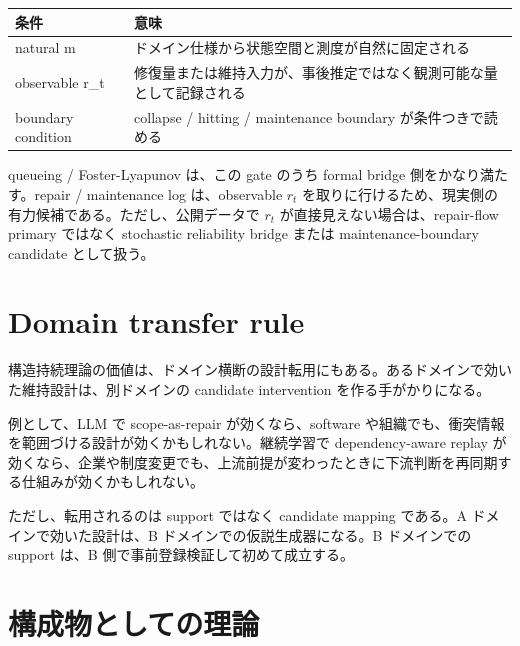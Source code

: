 \documentclass[12pt,a4paper]{article}
\begin{document}
{\def\LTcaptype{table} %
\begin{longtable}[]{@{}
  >{\raggedright\arraybackslash}p{}
  >{\raggedright\arraybackslash}p{}@{}}
\toprule\noalign{}
\begin{minipage}[b]{\linewidth}\raggedright
条件
\end{minipage} & \begin{minipage}[b]{\linewidth}\raggedright
意味
\end{minipage} \\
\midrule\noalign{}
\endhead
\bottomrule\noalign{}
\endlastfoot
natural m & ドメイン仕様から状態空間と測度が自然に固定される \\
observable r\_t & 修復量または維持入力が、事後推定ではなく観測可能な量として記録される \\
boundary condition & collapse / hitting / maintenance boundary が条件つきで読める \\
\end{longtable}
}

queueing / Foster-Lyapunov は、この gate のうち formal bridge 側をかなり満たす。repair / maintenance log は、observable \(r_{t}\) を取りに行けるため、現実側の有力候補である。ただし、公開データで \(r_{t}\) が直接見えない場合は、repair-flow primary ではなく stochastic reliability bridge または maintenance-boundary candidate として扱う。

\section{Domain transfer rule}\label{domain-transfer-rule}

構造持続理論の価値は、ドメイン横断の設計転用にもある。あるドメインで効いた維持設計は、別ドメインの candidate intervention を作る手がかりになる。

例として、LLM で scope-as-repair が効くなら、software や組織でも、衝突情報を範囲づける設計が効くかもしれない。継続学習で dependency-aware replay が効くなら、企業や制度変更でも、上流前提が変わったときに下流判断を再同期する仕組みが効くかもしれない。

ただし、転用されるのは support ではなく candidate mapping である。A ドメインで効いた設計は、B ドメインでの仮説生成器になる。B ドメインでの support は、B 側で事前登録検証して初めて成立する。

\section{構成物としての理論}\label{ux69cbux6210ux7269ux3068ux3057ux3066ux306eux7406ux8ad6}
\end{document}
